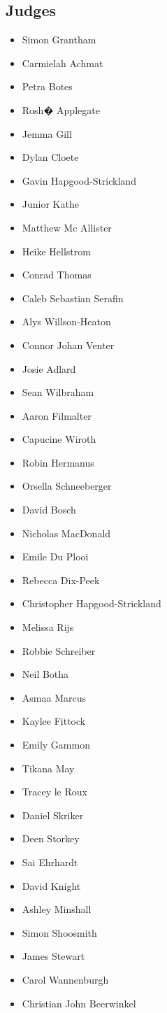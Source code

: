 \documentclass[10pt]{article}
\begin{document}
	\subsection*{Judges}
	\begin{itemize}

			\item Simon Grantham
			\item Carmielah Achmat
			\item Petra Botes
			\item Rosh� Applegate
			\item Jemma Gill
			\item Dylan Cloete
			\item Gavin Hapgood-Strickland
			\item Junior Kathe
			\item Matthew Mc Allister
			\item Heike Hellstrom
			\item Conrad Thomas
			\item Caleb Sebastian Serafin
			\item Alys Willson-Heaton
			\item Connor Johan Venter
			\item Josie Adlard
			\item Sean Wilbraham
			\item Aaron Filmalter
			\item Capucine Wiroth
			\item Robin Hermanus
			\item Orsella Schneeberger
			\item David Bosch
			\item Nicholas MacDonald
			\item Emile Du Plooi
			\item Rebecca Dix-Peek
			\item Christopher Hapgood-Strickland
			\item Melissa Rijs
			\item Robbie Schreiber
			\item Neil Botha
			\item Asmaa Marcus
			\item Kaylee Fittock
			\item Emily Gammon
			\item Tikana May
			\item Tracey le Roux
			\item Daniel Skriker
			\item Deen Storkey
			\item Sai Ehrhardt
			\item David Knight
			\item Ashley Minshall
			\item Simon Shoosmith
			\item James Stewart
			\item Carol Wannenburgh
			\item Christian John Beerwinkel
		\end{itemize}
\end{document}
